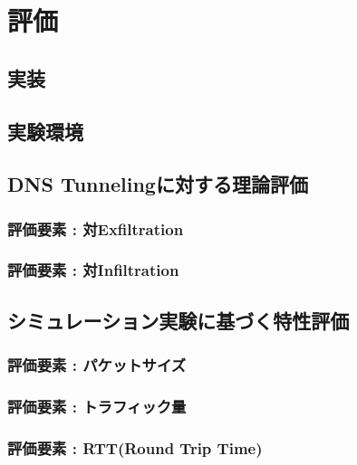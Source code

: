 \section{評価}
\subsection{実装}
\subsection{実験環境}
\subsection{DNS Tunnelingに対する理論評価}
\subsubsection{評価要素 : 対Exfiltration}
\subsubsection{評価要素 : 対Infiltration}
\subsection{シミュレーション実験に基づく特性評価}
\subsubsection{評価要素 : パケットサイズ}
\subsubsection{評価要素 : トラフィック量}
\subsubsection{評価要素 : RTT(Round Trip Time)}
